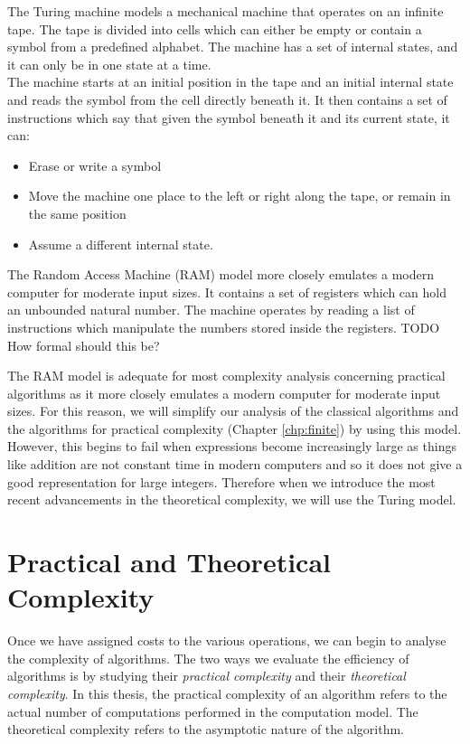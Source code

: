 The Turing machine models a mechanical machine that operates on an infinite tape. The tape is divided into cells which can either be empty or contain a symbol from a predefined alphabet. The machine has a set of internal states, and it can only be in one state at a time.\\
The machine starts at an initial position in the tape and an initial internal state and reads the symbol from the cell directly beneath it. It then contains a set of instructions which say that given the symbol beneath it and its current state, it can:
\begin{itemize}
    \item Erase or write a symbol
    \item Move the machine one place to the left or right along the tape, or remain in the same position
    \item Assume a different internal state.
\end{itemize}

The Random Access Machine (RAM) model more closely emulates a modern computer for moderate input sizes. It contains a set of registers which can hold an unbounded natural number. The machine operates by reading a list of instructions which manipulate the numbers stored inside the registers. TODO How formal should this be?

The RAM model is adequate for most complexity analysis concerning practical algorithms as it more closely emulates a modern computer for moderate input sizes. For this reason, we will simplify our analysis of the classical algorithms and the algorithms for practical complexity (Chapter \ref{chp:finite}) by using this model. However, this begins to fail when expressions become increasingly large as things like addition are not constant time in modern computers and so it does not give a good representation for large integers. Therefore when we introduce the most recent advancements in the theoretical complexity, we will use the Turing model.

\section{Practical and Theoretical Complexity}%
\label{sec:Practical and Theoretical Complexity}

Once we have assigned costs to the various operations, we can begin to analyse the complexity of algorithms. The two ways we evaluate the efficiency of algorithms is by studying their \emph{practical complexity} and their \emph{theoretical complexity}. In this thesis, the practical complexity of an algorithm refers to the actual number of computations performed in the computation model. The theoretical complexity refers to the asymptotic nature of the algorithm. 

